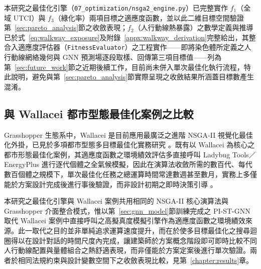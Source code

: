 本研究之最佳化引擎（\texttt{07\_optimization/nsga2\_engine.py}）已完整實作 $f_1$（全域 UTCI）與 $f_3$（綠化率）兩項目標之適應度函數，並以此二維目標空間驗證第~\ref{sec:pareto_analysis}節之收斂表現；$f_2$（人行動線熱暴露）之數學定義與推導已於式~\eqref{eq:walkway_exposure}及附錄~\ref{appx:walkway_derivation}完整給出，其整合入適應度評估器（\texttt{FitnessEvaluator}）之工程實作——即將染色體所定義之人行動線網絡幾何與 GNN 預測場逐段取樣、回傳第三項目標值——列為第~\ref{sec:future_work}節之近期後續工作，目前尚未併入單次最佳化執行流程，特此說明，避免與第~\ref{sec:pareto_analysis}節實際呈現之收斂結果所涵蓋目標數產生混淆。


\subsection{與 Wallacei 都市型態最佳化案例之比較}
\label{subsec:wallacei_comparison}

Grasshopper 生態系中，Wallacei 是目前應用最廣泛之進階 NSGA-II 視覺化最佳化外掛，已見於多項都市型態多目標最佳化實務研究 \citep{wortmann2017opossum, daglier2025developing}。既有以 Wallacei 為核心之都市形態最佳化案例，其適應度函數之環境績效評估多直接呼叫 Ladybug Tools／EnergyPlus 進行逐代個體之全氣候模擬，因此在演算法收斂所需的數百代、每代數百個體之規模下，單次最佳化任務之總運算時間常達數週甚至數月，實務上多僅能於方案設計完成後進行事後驗證，而非設計初期之即時決策引導 \citep{aman2023ai, daglier2025developing}。

本研究之最佳化引擎與 Wallacei 案例共用相同的 NSGA-II 核心演算法與 Grasshopper 介面整合模式，惟以第~\ref{sec:gnn_model}節訓練完成之 PI-ST-GNN 取代 Wallacei 案例中直接呼叫之高擬真度模擬引擎作為適應度函數之環境績效來源。此一取代之目的並非單純追求運算速度提升，而在於使多目標最佳化之搜尋迴圈得以在設計對話的時間尺度內完成，讓建築師於方案概念階段即可即時比較不同人行動線配置與量體組合之熱舒適表現，而非僅能於方案定案後進行單次驗證。兩者於相同法規約束與設計變數空間下之收斂表現比較，見第~\ref{chapter:results}章。
